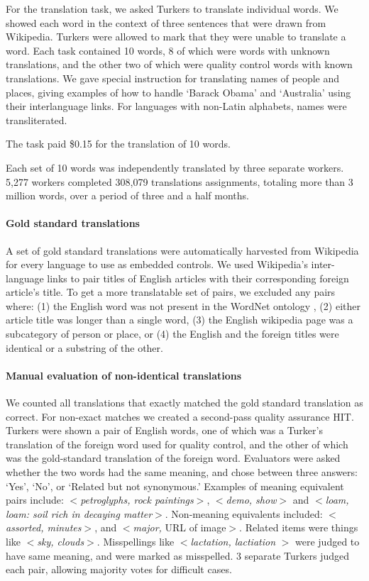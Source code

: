 \documentclass[11pt]{article}
\begin{document}
For the translation task, we asked Turkers to translate individual words.  We showed each word in the context of three sentences that were drawn from Wikipedia.  
Turkers were allowed to mark that they were unable to translate a word. Each task contained 10 words, 8 of which were words with unknown translations, and the other two of which were quality control words with known translations.   
We gave special instruction for translating names of people and places, giving examples of how to handle `Barack Obama' and `Australia' using their interlanguage links. For languages with non-Latin alphabets, names were transliterated. 

The task paid \$0.15 for the translation of 10 words.  

Each set of 10 words was independently translated by three separate workers.  5,277 workers completed 308,079 translations assignments, totaling more than 3 million words, over a period of three and a half months.

\paragraph{Gold standard translations} 
A set of gold standard translations were automatically harvested from Wikipedia  for every language to use as embedded controls. We used Wikipedia's inter-language links to pair titles of English articles with their corresponding foreign article's title.  To get a more translatable set of pairs, we excluded any pairs where: (1) the English word was not present in the WordNet ontology  \cite{miller1995wordnet}, (2) either article title was longer than a single word, (3) the English wikipedia page was a subcategory of person or place, or (4) the English and the foreign titles were identical or a substring of the other.

\paragraph{Manual evaluation of non-identical translations}
We counted all translations that exactly matched the gold standard translation as correct.  For non-exact matches we created a second-pass quality assurance HIT.  
Turkers were shown a pair of English words, one of which was a Turker's translation of the foreign word used for quality control, and the other of which was the gold-standard translation of the foreign word. Evaluators were asked whether the two words had the same meaning, and chose between three answers: `Yes', `No', or `Related but not synonymous.'  Examples of meaning equivalent pairs include: $<${\it petroglyphs, rock paintings}$>$, $<${\it demo, show}$>$ and  $<${\it loam, loam: soil rich in decaying matter}$>$.  Non-meaning equivalents included: $<${\it assorted, minutes}$>$, and $<${\it major,} URL of image$>$.  Related items were things like $<${\it sky, clouds}$>$. Misspellings like $<${\it lactation, lactiation} $>$ were judged to have same meaning, and were marked as misspelled.   3 separate Turkers judged each pair, allowing majority votes for difficult cases. 
\end{document}
